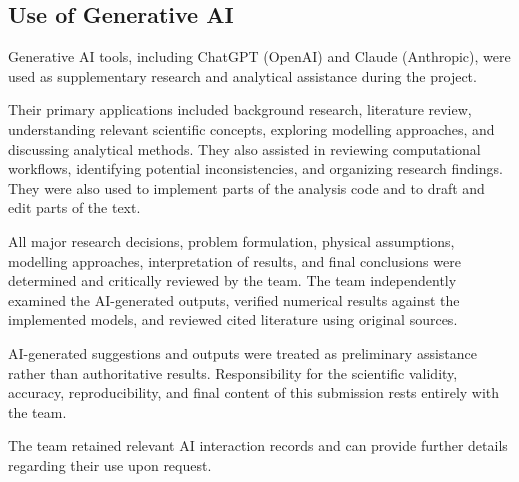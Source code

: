 \subsection{Use of Generative AI}

Generative AI tools, including ChatGPT (OpenAI) and Claude (Anthropic), were used as supplementary research and analytical assistance during the project.

Their primary applications included background research, literature review, understanding relevant scientific concepts, exploring modelling approaches, and discussing analytical methods. They also assisted in reviewing computational workflows, identifying potential inconsistencies, and organizing research findings. They were also used to implement parts of the analysis code and to draft and edit parts of the text.

All major research decisions, problem formulation, physical assumptions, modelling approaches, interpretation of results, and final conclusions were determined and critically reviewed by the team. The team independently examined the AI-generated outputs, verified numerical results against the implemented models, and reviewed cited literature using original sources.

AI-generated suggestions and outputs were treated as preliminary assistance rather than authoritative results. Responsibility for the scientific validity, accuracy, reproducibility, and final content of this submission rests entirely with the team.

The team retained relevant AI interaction records and can provide further details regarding their use upon request.
